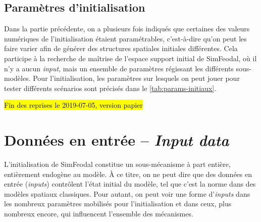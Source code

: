 

\clearpage
\subsection{Paramètres d'initialisation}

Dans la partie précédente, on a plusieurs fois indiqués que certaines des valeurs numériques de l'initialisation étaient paramétrables, c'est-à-dire qu'on peut les faire varier afin de générer des structures spatiales initiales différentes.
Cela participe à la recherche de maîtrise de l'espace support initial de SimFeodal, où il n'y a aucun \og \textit{input}\fg{}, mais un ensemble de paramètres régissant les différents sous-modèles.
Pour l'initialisation, les paramètres sur lesquels on peut jouer pour tester différents scénarios sont précisés dans le \cref{tab:params-initiaux}.





\begin{center}	
	\hl{Fin des reprises le 2019-07-05, version papier}
\end{center}


\let\orisectionmark\sectionmark
\renewcommand\sectionmark[1]{}%
\section[Données en entrée -- \textit{Input data}]{Données en entrée -- \large{\textit{Input data}}}
\orisectionmark{Données en entrée}
\let\sectionmark\orisectionmark

L'initialisation de SimFeodal constitue un sous-mécanisme à part entière, entièrement endogène au modèle.
À ce titre, on ne peut dire que des données en entrée (\textit{inputs}) contrôlent l'état initial du modèle, tel que c'est la norme dans des modèles spatiaux classiques.
Pour autant, on peut voir une forme d'\textit{inputs} dans les nombreux paramètres mobilisés pour l'initialisation et dans ceux, plus nombreux encore, qui influencent l'ensemble des mécanismes.

